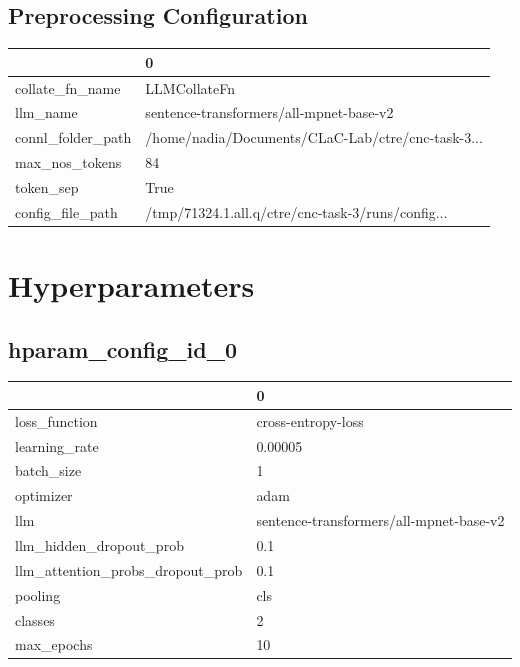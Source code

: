 \documentclass{article}
\begin{document}
\subsection{Preprocessing Configuration}
\begin{tabular}{ll}
\toprule
{} &                                                  0 \\
\midrule
collate\_fn\_name   &                                       LLMCollateFn \\
llm\_name          &            sentence-transformers/all-mpnet-base-v2 \\
connl\_folder\_path &  /home/nadia/Documents/CLaC-Lab/ctre/cnc-task-3... \\
max\_nos\_tokens    &                                                 84 \\
token\_sep         &                                               True \\
config\_file\_path  &  /tmp/71324.1.all.q/ctre/cnc-task-3/runs/config... \\
\bottomrule
\end{tabular}

\section{Hyperparameters}
\subsection{hparam\_config\_id\_0}
\begin{tabular}{ll}
\toprule
{} &                                        0 \\
\midrule
loss\_function                    &                       cross-entropy-loss \\
learning\_rate                    &                                  0.00005 \\
batch\_size                       &                                        1 \\
optimizer                        &                                     adam \\
llm                              &  sentence-transformers/all-mpnet-base-v2 \\
llm\_hidden\_dropout\_prob          &                                      0.1 \\
llm\_attention\_probs\_dropout\_prob &                                      0.1 \\
pooling                          &                                      cls \\
classes                          &                                        2 \\
max\_epochs                       &                                       10 \\
\bottomrule
\end{tabular}
\end{document}
